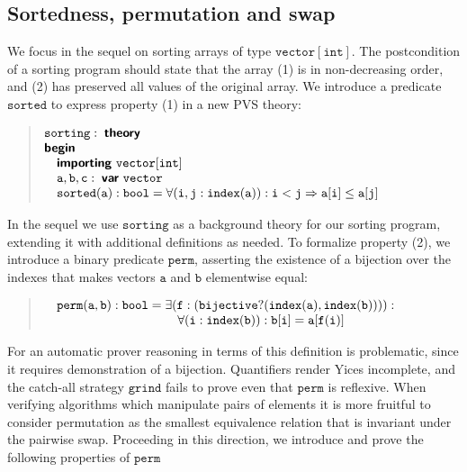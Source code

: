 \documentclass[english,submission]{eptcs}
\begin{document}
\subsection{Sortedness, permutation and swap}

We focus in the sequel on sorting arrays of type $\mathtt{vector[int]}$.
The postcondition of a sorting program should state that the array
(1) is in non-decreasing order, and (2) has preserved all values of
the original array. We introduce a predicate $\mathtt{sorted}$ to
express property (1) in a new PVS theory:
\begin{quote}
$\begin{array}[t]{@{}l}
\mathtt{sorting}:\;\textsf{\textbf{theory}}\\
\textsf{\textbf{begin}}\\
\quad\begin{array}[t]{@{}l}
\textsf{\textbf{importing}}\ \mathtt{vector[int]}\\
\mathtt{a,b,c}:\;\textsf{\textbf{var}}\ \mathtt{vector}\\
\mathtt{sorted(a):bool=\forall(i,j:index(a)):i<j\Rightarrow a[i]\le a[j]}
\end{array}
\end{array}$
\end{quote}
\noindent In the sequel we use $\mathtt{sorting}$ as a background
theory for our sorting program, extending it with additional definitions
as needed. To formalize property (2), we introduce a binary predicate
$\mathtt{perm}$, asserting the existence of a bijection over the
indexes that makes vectors $\mathtt{a}$ and $\mathtt{b}$ elementwise
equal:
\begin{quote}
$\quad\mathtt{perm(a,b):bool=\begin{array}[t]{@{}l}
\mathtt{\mathtt{\exists(f:(bijective?(index(a),index(b)))):}}\\
\quad\mathtt{\forall(i:index(b)):b[i]=a[f(i)]}
\end{array}}$
\end{quote}
\noindent For an automatic prover reasoning in terms of this definition
is problematic, since it requires demonstration of a bijection. Quantifiers
render Yices incomplete, and the catch-all strategy $\texttt{grind}$
fails to prove even that $\mathtt{perm}$ is reflexive. When verifying
algorithms which manipulate pairs of elements it is more fruitful
to consider permutation as the smallest equivalence relation that
is invariant under the pairwise swap. Proceeding in this direction,
we introduce and prove the following properties of $\mathtt{perm}$
\end{document}
